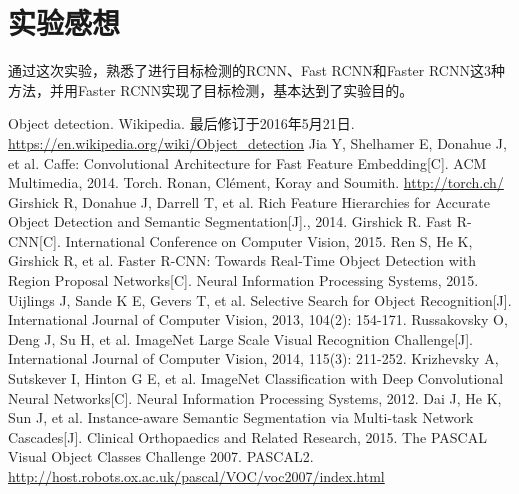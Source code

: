 \documentclass[a4paper, 12pt, UTF8]{article}
\begin{document}
\section{实验感想}

通过这次实验，熟悉了进行目标检测的RCNN、Fast RCNN和Faster RCNN这3种方法，并用Faster RCNN实现了目标检测，基本达到了实验目的。


\renewcommand{\refname}{参考}
\begin{thebibliography}{9}
 Object detection. Wikipedia. 最后修订于2016年5月21日. \url{https://en.wikipedia.org/wiki/Object_detection}
 Jia Y, Shelhamer E, Donahue J, et al. Caffe: Convolutional Architecture for Fast Feature Embedding[C]. ACM Multimedia, 2014.
 Torch. Ronan, Clément, Koray and Soumith. \url{http://torch.ch/}
 Girshick R, Donahue J, Darrell T, et al. Rich Feature Hierarchies for Accurate Object Detection and Semantic Segmentation[J]., 2014.
 Girshick R. Fast R-CNN[C]. International Conference on Computer Vision, 2015.
 Ren S, He K, Girshick R, et al. Faster R-CNN: Towards Real-Time Object Detection with Region Proposal Networks[C]. Neural Information Processing Systems, 2015.
 Uijlings J, Sande K E, Gevers T, et al. Selective Search for Object Recognition[J]. International Journal of Computer Vision, 2013, 104(2): 154-171.
 Russakovsky O, Deng J, Su H, et al. ImageNet Large Scale Visual Recognition Challenge[J]. International Journal of Computer Vision, 2014, 115(3): 211-252.
 Krizhevsky A, Sutskever I, Hinton G E, et al. ImageNet Classification with Deep Convolutional Neural Networks[C]. Neural Information Processing Systems, 2012.
 Dai J, He K, Sun J, et al. Instance-aware Semantic Segmentation via Multi-task Network Cascades[J]. Clinical Orthopaedics and Related Research, 2015.
 The PASCAL Visual Object Classes Challenge 2007.  PASCAL2. \url{http://host.robots.ox.ac.uk/pascal/VOC/voc2007/index.html}
\end{thebibliography}
\end{document}
